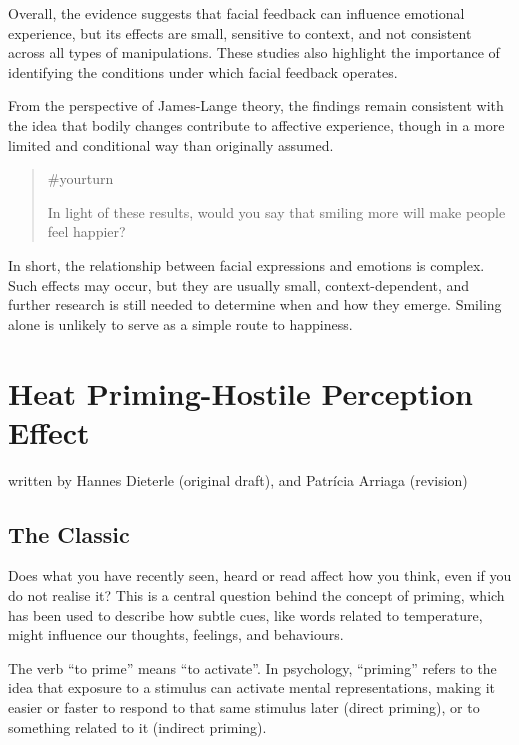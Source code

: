 \documentclass[
  letterpaper,
]{book}
\begin{document}
Overall, the evidence suggests that facial feedback can influence
emotional experience, but its effects are small, sensitive to context,
and not consistent across all types of manipulations. These studies also
highlight the importance of identifying the conditions under which
facial feedback operates.

From the perspective of James-Lange theory, the findings remain
consistent with the idea that bodily changes contribute to affective
experience, though in a more limited and conditional way than originally
assumed.

\begin{quote}
{\#yourturn}

In light of these results, would you say that smiling more will make
people feel happier?
\end{quote}

In short, the relationship between facial expressions and emotions is
complex. Such effects may occur, but they are usually small,
context-dependent, and further research is still needed to determine
when and how they emerge. Smiling alone is unlikely to serve as a simple
route to happiness.


\chapter{\texorpdfstring{{Heat Priming-Hostile Perception
Effect}}{Heat Priming-Hostile Perception Effect}}\label{heat-priming-hostile-perception-effect}

{written by Hannes Dieterle (original draft), and Patrícia Arriaga
(revision)}

\section{The Classic}\label{the-classic-21}

Does what you have recently seen, heard or read affect how you think,
even if you do not realise it? This is a central question behind the
concept of priming, which has been used to describe how subtle cues,
like words related to temperature, might influence our thoughts,
feelings, and behaviours.

The verb ``to prime'' means ``to activate''. In psychology, ``priming''
refers to the idea that exposure to a stimulus can activate mental
representations, making it easier or faster to respond to that same
stimulus later (direct priming), or to something related to it (indirect
priming).
\end{document}
